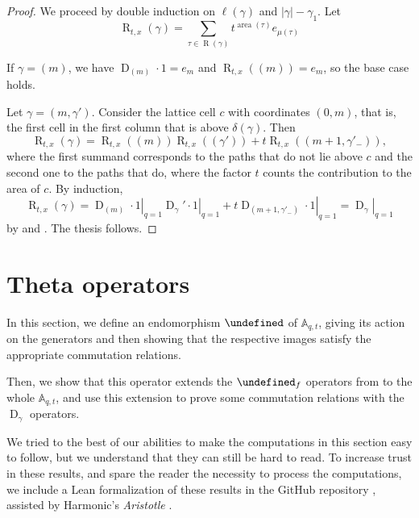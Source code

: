 \documentclass[reqno]{amsart}
\theoremstyle{plain}
\theoremstyle{definition}
\theoremstyle{remark}
\DeclareMathOperator{\D}{D}
\DeclareMathOperator{\R}{R}
\DeclareMathOperator{\area}{area}
\newcommand{\A}{\mathbb{A}}%
\let\oldTheta\Theta
\let\Theta\undefined
\DeclareMathOperator{\Theta}{\oldTheta}
\newcommand{\<}{\langle}
\renewcommand{\>}{\rangle}
\begin{document}
\begin{proof}
    We proceed by double induction on $\ell(\gamma)$ and $\lvert \gamma \rvert - \gamma_1$. Let \[ \R_{t,x}(\gamma) = \sum_{\tau \in \R(\gamma)} t^{\area(\tau)} e_{\mu(\tau)} \]

    If $\gamma = (m)$, we have $\D_{(m)} \cdot 1 = e_m$ and $\R_{t,x}((m)) = e_m$, so the base case holds.

    Let $\gamma = (m, \gamma')$. Consider the lattice cell $c$ with coordinates $(0, m)$, that is, the first cell in the first column that is above $\delta(\gamma)$. Then \[ \R_{t,x}(\gamma) = \R_{t,x}((m))\R_{t,x}((\gamma')) + t \R_{t,x}((m+1, \gamma'_-)), \] where the first summand corresponds to the paths that do not lie above $c$ and the second one to the paths that do, where the factor $t$ counts the contribution to the area of $c$. By induction,
    \[
        \R_{t,x}(\gamma) = \left. \D_{(m)} \cdot 1 \right\rvert_{q=1} \left. \D_\gamma' \cdot 1 \right\rvert_{q=1} + t \left. \D_{(m+1, \gamma'_-)} \cdot 1 \right\rvert_{q=1} 
        = \left. \D_\gamma \right\rvert_{q=1}
    \]
    by  and . The thesis follows.
\end{proof}


\section{Theta operators}
\label{sec:Theta}

In this section, we define an endomorphism $\Theta$ of $\A_{q,t}$, giving its action on the generators and then showing that the respective images satisfy the appropriate commutation relations.

Then, we show that this operator extends the $\Theta_f$ operators from \cite{DAdderioIraciVandenWyngaerd2021ThetaOperators} to the whole $\A_{q,t}$, and use this extension to prove some commutation relations with the $\D_\gamma$ operators.

We tried to the best of our abilities to make the computations in this section easy to follow, but we understand that they can still be hard to read. To increase trust in these results, and spare the reader the necessity to process the computations, we include a Lean formalization of these results in the GitHub repository  \cite{Iraci2026code}, assisted by Harmonic's \emph{Aristotle} \cite{Achim2025Aristotle}.
\end{document}
